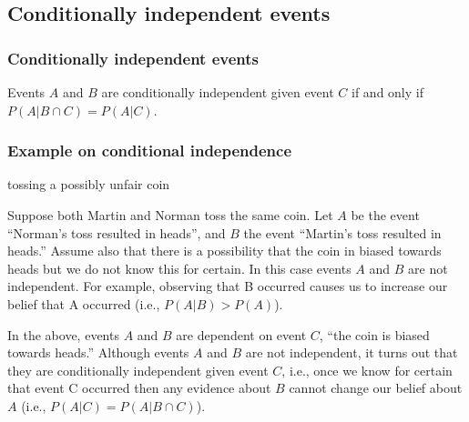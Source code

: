 \subsection{Conditionally independent events}

\begin{frame}
    \frametitle{Conditionally independent events}
    \label{slide:conditionallyIndependentEvents}

    \begin{probDef}
        Events $A$ and $B$ are conditionally independent given event $C$ if and
        only if $P(A|B\cap C)=P(A|C)$.
    \end{probDef}

\end{frame}

\begin{frame}
    \frametitle{Example on conditional independence}

    \scriptsize
    \begin{manualProbExample}{tossing a possibly unfair coin}

        Suppose both Martin and Norman toss the same coin. Let $A$ be the event
        ``Norman's toss resulted in heads'', and $B$ the event ``Martin's toss
        resulted in heads.'' Assume also that there is a possibility that the
        coin in biased towards heads but we do not know this for certain.  In
        this case events $A$ and $B$ are not independent. For example, observing
        that B occurred causes us to increase our belief that A occurred (i.e.,
        $P(A|B)>P(A)$).

        In the above, events $A$ and $B$ are dependent on event $C$, ``the coin
        is biased towards heads.'' Although events $A$ and $B$ are not
        independent, it turns out that they are conditionally independent given
        event $C$, i.e., once we know for certain that event C occurred then
        any evidence about $B$ cannot change our belief about $A$ (i.e.,
        $P(A|C) = P(A|B\cap C)$).

    \end{manualProbExample}
    \normalsize

\end{frame}


